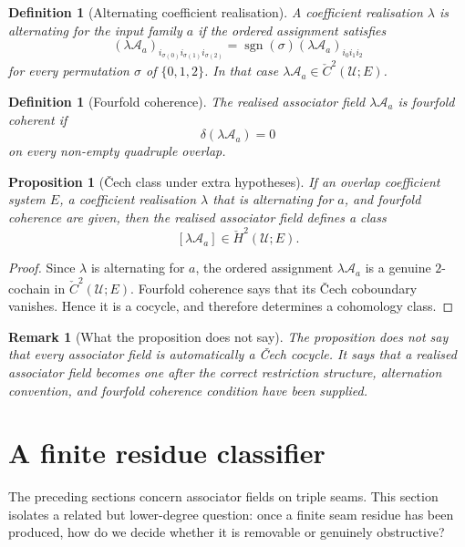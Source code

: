\documentclass[11pt]{article}
\newtheorem{proposition}[theorem]{Proposition}
\newtheorem{definition}[theorem]{Definition}
\newtheorem{remark}[theorem]{Remark}
\newcommand{\Cech}{\check{C}}
\newcommand{\CechH}{\check{H}}
\begin{document}
\begin{definition}[Alternating coefficient realisation]
A coefficient realisation \(\lambda\) is alternating for the input family \(a\) if the ordered assignment satisfies
\[
(\lambda\mathcal A_a)_{i_{\sigma(0)}i_{\sigma(1)}i_{\sigma(2)}}
=
\operatorname{sgn}(\sigma)(\lambda\mathcal A_a)_{i_0i_1i_2}
\]
for every permutation \(\sigma\) of \(\{0,1,2\}\). In that case \(\lambda\mathcal A_a\in \Cech^2(\mathcal U;E)\).
\end{definition}

\begin{definition}[Fourfold coherence]
The realised associator field \(\lambda\mathcal A_a\) is fourfold coherent if
\[
\delta(\lambda\mathcal A_a)=0
\]
on every non-empty quadruple overlap.
\end{definition}

\begin{proposition}[\v{C}ech class under extra hypotheses]
If an overlap coefficient system \(E\), a coefficient realisation \(\lambda\) that is alternating for \(a\), and fourfold coherence are given, then the realised associator field defines a class
\[
[\lambda\mathcal A_a]\in \CechH^2(\mathcal U;E).
\]
\end{proposition}

\begin{proof}
Since \(\lambda\) is alternating for \(a\), the ordered assignment \(\lambda\mathcal A_a\) is a genuine \(2\)-cochain in \(\Cech^2(\mathcal U;E)\). Fourfold coherence says that its \v{C}ech coboundary vanishes. Hence it is a cocycle, and therefore determines a cohomology class.
\end{proof}

\begin{remark}[What the proposition does not say]
The proposition does not say that every associator field is automatically a \v{C}ech cocycle. It says that a realised associator field becomes one after the correct restriction structure, alternation convention, and fourfold coherence condition have been supplied.
\end{remark}

\section{A finite residue classifier}\label{sec:finite-classifier}

The preceding sections concern associator fields on triple seams. This section isolates a related but lower-degree question: once a finite seam residue has been produced, how do we decide whether it is removable or genuinely obstructive?
\end{document}
